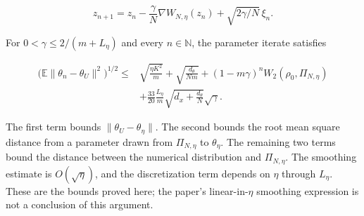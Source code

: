 \documentclass[11pt,a4paper]{article}
\begin{document}
\[z_{n+1}=z_n-\frac\gamma N\nabla W_{N,\eta}(z_n)+\sqrt{2\gamma/N}\,\xi_n.\]


For \(0<\gamma\le2/(m+L_\eta)\) and every \(n\in\mathbb N\), the parameter iterate satisfies


\[\begin{aligned}
\bigl(\mathbb E\|\theta_n-\theta_U\|^2\bigr)^{1/2}
\le{}&\sqrt{\frac{\eta K^2}{m}}+\sqrt{\frac{d_\theta}{Nm}}
+(1-m\gamma)^nW_2(\rho_0,\Pi_{N,\eta})\\
&+\frac{33}{20}\frac{L_\eta}{m}\sqrt{d_x+\frac{d_\theta}{N}}\sqrt\gamma.
\end{aligned}\]


The first term bounds \(\|\theta_U-\theta_\eta\|\). The second bounds the root mean square distance from a parameter drawn from \(\Pi_{N,\eta}\) to \(\theta_\eta\). The remaining two terms bound the distance between the numerical distribution and \(\Pi_{N,\eta}\). The smoothing estimate is \(O(\sqrt\eta)\), and the discretization term depends on \(\eta\) through \(L_\eta\). These are the bounds proved here; the paper's linear-in-\(\eta\) smoothing expression is not a conclusion of this argument.
\end{document}
